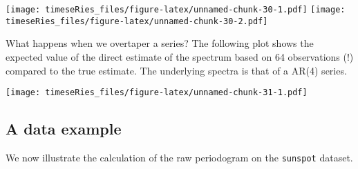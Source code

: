 \documentclass[]{book}
\begin{document}
\texttt{[image: timeseRies\_files/figure-latex/unnamed-chunk-30-1.pdf]}
\texttt{[image: timeseRies\_files/figure-latex/unnamed-chunk-30-2.pdf]}

What happens when we overtaper a series? The following plot shows the
expected value of the direct estimate of the spectrum based on 64
observations (!) compared to the true estimate. The underlying spectra
is that of a AR(4) series.

\texttt{[image: timeseRies\_files/figure-latex/unnamed-chunk-31-1.pdf]}

\hypertarget{a-data-example}{%
\subsection{A data example}\label{a-data-example}}

We now illustrate the calculation of the raw periodogram on the
\texttt{sunspot} dataset.
\end{document}
